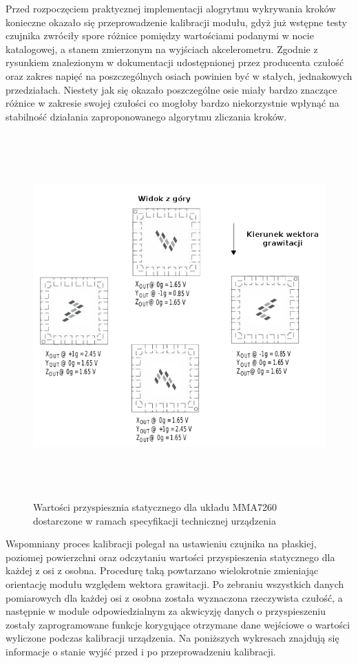 Przed rozpoczęciem praktycznej implementacji alogrytmu wykrywania kroków
konieczne okazało się przeprowadzenie kalibracji modułu, gdyż już wstępne testy
czujnika zwróciły spore różnice pomiędzy wartościami podanymi w nocie
katalogowej, a stanem zmierzonym na wyjściach akcelerometru. Zgodnie z rysunkiem
znalezionym w dokumentacji udostępnionej przez producenta czułość oraz zakres
napięć na poszczególnych osiach powinien być w stałych, jednakowych
przedziałach. Niestety jak się okazało poszczególne osie miały bardzo znaczące
różnice w zakresie swojej czułości co mogłoby bardzo niekorzystnie wpłynąć na
stabilność działania zaproponowanego algorytmu zliczania kroków. 

\begin{figure}[h!]
 \centering
 \includegraphics[height=140mm]{../images/ch04/mma7260_datasheet.png}
 \caption{Wartości przyspiesznia statycznego dla układu MMA7260 dostarczone w
 ramach specyfikacji technicznej urządzenia\cite{MMA7260DataSheet}}
 \label{fig:MMADataSheetStaticAcc}
\end{figure}

Wspomniany proces kalibracji polegał na ustawieniu czujnika na płaskiej,
poziomej powierzchni oraz odczytaniu wartości przyspieszenia statycznego dla
każdej z osi z osobna. Procedurę taką powtarzano wielokrotnie zmieniając
orientację modułu względem wektora grawitacji. Po zebraniu wszystkich danych
pomiarowych dla każdej osi z osobna została wyznaczona rzeczywista czułość, a
następnie w module odpowiedzialnym za akwicyzję danych o przyspieszeniu zostały
zaprogramowane funkcje korygujące otrzymane dane wejściowe o wartości wyliczone
podczas kalibracji urządzenia. Na poniższych wykresach znajdują się informacje o
stanie wyjść przed i po przeprowadzeniu kalibracji. 

